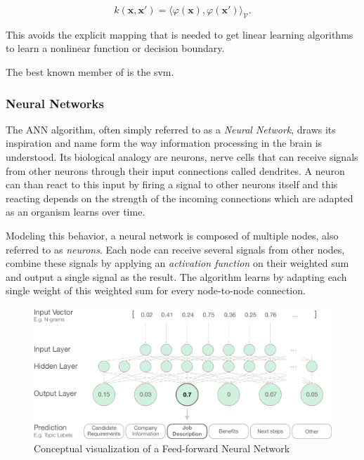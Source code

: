 \begin{equation}
  k(\mathbf {x} ,\mathbf {x'} )=\langle \varphi (\mathbf {x} ),\varphi (\mathbf {x'} )\rangle _{\mathcal {V}}.
\end{equation}

This avoids the explicit mapping that is needed to get linear learning algorithms to learn a nonlinear function or decision boundary.

The best known member of is the \gls{svm}. 

\subsubsection{Neural Networks}
\label{subs:Neural Networks}

The \gls{ANN} algorithm, often simply referred to as a \emph{Neural Network}, draws its inspiration and name form the way information processing in the brain is understood. Its biological analogy are neurons, nerve cells that can receive signals from other neurons through their input connections called dendrites. A neuron can than react to this input by firing a signal to other neurons itself and this reacting depends on the strength of the incoming connections which are adapted as an organism learns over time.

Modeling this behavior, a neural network is composed of multiple nodes, also referred to as \emph{neurons}. Each node can receive several signals from other nodes, combine these signals by applying an \emph{activation function} on their weighted sum and output a single signal as the result. The algorithm learns by adapting each single weight of this weighted sum for every node-to-node connection.

\begin{figure}[h]
  \centering
  \includegraphics[width=1\textwidth]{img/NN}
  \caption{Conceptual visualization of a Feed-forward Neural Network}
  \label{fig:NN}
\end{figure}

